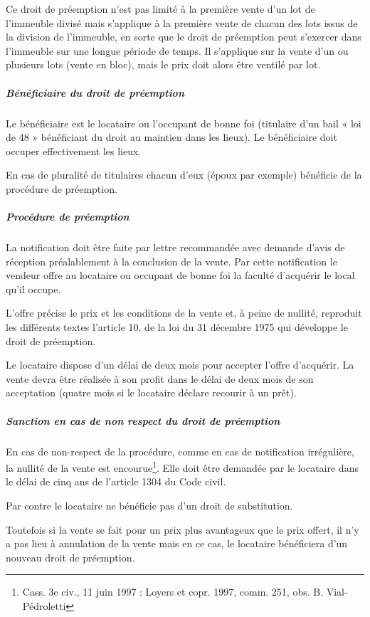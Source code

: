 				Ce droit de préemption n’est pas limité à la première vente d’un lot de l’immeuble divisé mais s’applique
				à la première vente de chacun des lots issus de la division de l’immeuble, en sorte que le droit de
				préemption peut s’exercer dans l’immeuble sur une longue période de temps. Il s’applique sur la vente
				d’un ou plusieurs lots (vente en bloc), mais le prix doit alors être ventilé par lot.
				
				\subparagraph{Bénéficiaire du droit de préemption}
				
				Le bénéficiaire est le locataire ou l’occupant de bonne foi (titulaire d’un bail « loi de 48 » bénéficiant du
				droit au maintien dans les lieux). Le bénéficiaire doit occuper effectivement les lieux.
				
				En cas de pluralité de titulaires chacun d’eux (époux par exemple) bénéficie de la procédure de
				préemption.
				
				\subparagraph{Procédure de préemption}
				
				La notification doit être faite par lettre recommandée avec demande d'avis de réception préalablement à
				la conclusion de la vente. Par cette notification le vendeur offre au locataire ou occupant de bonne foi la
				faculté d’acquérir le local qu’il occupe.
				
				L’offre précise le prix et les conditions de la vente et, à peine de nullité, reproduit les différents textes
				l'article 10, \I{} de la loi du 31 décembre 1975 qui développe le droit de préemption.
				
				Le locataire dispose d’un délai de deux mois pour accepter l’offre d’acquérir. La vente devra être réalisée
				à son profit dans le délai de deux mois de son acceptation (quatre mois si le locataire déclare recourir à un
				prêt).
				
				\subparagraph{Sanction en cas de non respect du droit de préemption}
				
				En cas de non-respect de la procédure, comme en cas de notification irrégulière, la nullité de la vente est
				encourue\footnote{Cass. 3e civ., 11 juin 1997 : Loyers et copr. 1997, comm. 251, obs. B. Vial-Pédroletti}. Elle doit être demandée par le locataire dans le délai de cinq ans de l’article 1304 du Code	civil.
				
				Par contre le locataire ne bénéficie pas d’un droit de substitution.
				
				Toutefois si la vente se fait pour un prix plus avantageux que le prix offert, il n’y a pas lieu à annulation de la vente mais en ce cas, le locataire bénéficiera d’un nouveau droit de préemption.
			
